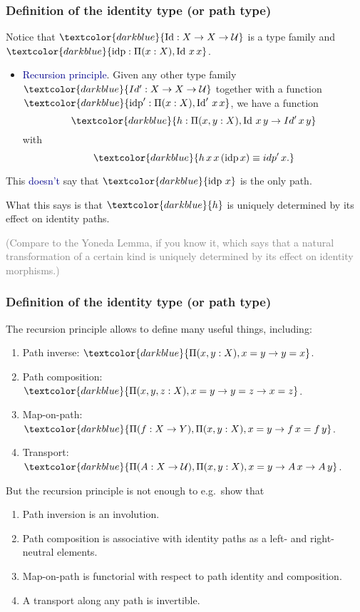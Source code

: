 \documentclass[aspectratio=169]{beamer}
\newcommand{\eqq}{\equiv}
\newcommand{\U}{\operatorname{\mathcal{U}}}
\newcommand{\db}{\textcolor{darkblue}}
\newcommand{\grey}{\textcolor{grey}}
\newcommand{\m}[1]{$\db{#1}$}
\newcommand{\M}[1]{\[\db{#1}\]}
\newcommand{\idp}{\operatorname{idp}}
\newcommand{\Id}{\operatorname{Id}}
\begin{document}
\begin{frame}
  \frametitle{Definition of the identity type (or path type)}

  Notice that \m{\Id : X \to X \to \U} is a type family and \m{\idp : \Pi(x:X), \Id \, x \, x}. 
   
  \begin{itemize}
    \vfill \item \db{Recursion principle}. Given any other type family \m{Id' : X \to X \to \U} together with a function \m{\idp' : \Pi(x:X), \Id' \, x \, x}, we have a function 
    \M{h : \Pi(x,y:X), \Id\,x\,y \to Id'\,x \, y  }
    with
    \M{h\,x\,x\,(\idp x) \eqq idp' \, x.}
   \end{itemize}

    This \db{doesn't} say that \m{\idp \, x} is the only path.

\vfill
    
    What this says is that \m{h} is uniquely determined by its effect on identity paths.

\vfill
    
    \grey{(Compare to the Yoneda Lemma, if you know it, which says that a
    natural transformation of a certain kind is uniquely determined by
    its effect on identity morphisms.)}

 \end{frame}


\begin{frame}
  \frametitle{Definition of the identity type (or path type)}

  The recursion principle allows to define many useful things, including:
  \begin{enumerate}
  \item Path inverse: \m{\Pi(x,y:X), x = y \to y = x}.
  \item Path composition: \m{\Pi(x,y,z:X), x = y \to y = z \to x = z}.
  \item Map-on-path: \m{\Pi(f:X \to Y),\Pi(x,y:X), x = y \to f \, x = f \, y}.
  \item Transport: \m{\Pi(A : X \to \U), \Pi (x,y:X), x = y \to A \, x \to A \, y}.
\end{enumerate}

But the recursion principle is not enough to e.g.\ show that
\begin{enumerate}
\item Path inversion is an involution.
\item Path composition is associative with identity paths as a left- and right-neutral elements.
\item Map-on-path is functorial with respect to path identity and composition.
\item A transport along any path is invertible.
\end{enumerate}


 \end{frame}
\end{document}
